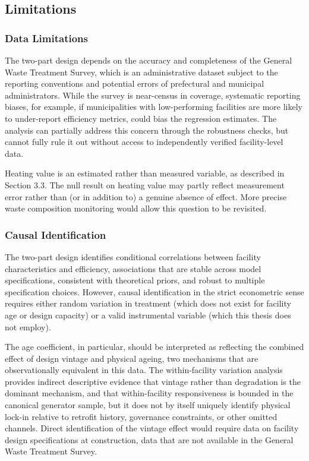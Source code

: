 \documentclass[12pt,a4paper]{article}
\begin{document}
\subsection{Limitations}

\subsubsection{Data Limitations}

The two-part design depends on the accuracy and completeness of the General Waste Treatment Survey, which is an administrative dataset subject to the reporting conventions and potential errors of prefectural and municipal administrators. While the survey is near-census in coverage, systematic reporting biases, for example, if municipalities with low-performing facilities are more likely to under-report efficiency metrics, could bias the regression estimates. The analysis can partially address this concern through the robustness checks, but cannot fully rule it out without access to independently verified facility-level data.

Heating value is an estimated rather than measured variable, as described in Section 3.3. The null result on heating value may partly reflect measurement error rather than (or in addition to) a genuine absence of effect. More precise waste composition monitoring would allow this question to be revisited.

\subsubsection{Causal Identification}

The two-part design identifies conditional correlations between facility characteristics and efficiency, associations that are stable across model specifications, consistent with theoretical priors, and robust to multiple specification choices. However, causal identification in the strict econometric sense requires either random variation in treatment (which does not exist for facility age or design capacity) or a valid instrumental variable (which this thesis does not employ).

The age coefficient, in particular, should be interpreted as reflecting the combined effect of design vintage and physical ageing, two mechanisms that are observationally equivalent in this data. The within-facility variation analysis provides indirect descriptive evidence that vintage rather than degradation is the dominant mechanism, and that within-facility responsiveness is bounded in the canonical generator sample, but it does not by itself uniquely identify physical lock-in relative to retrofit history, governance constraints, or other omitted channels. Direct identification of the vintage effect would require data on facility design specifications at construction, data that are not available in the General Waste Treatment Survey.
\end{document}
